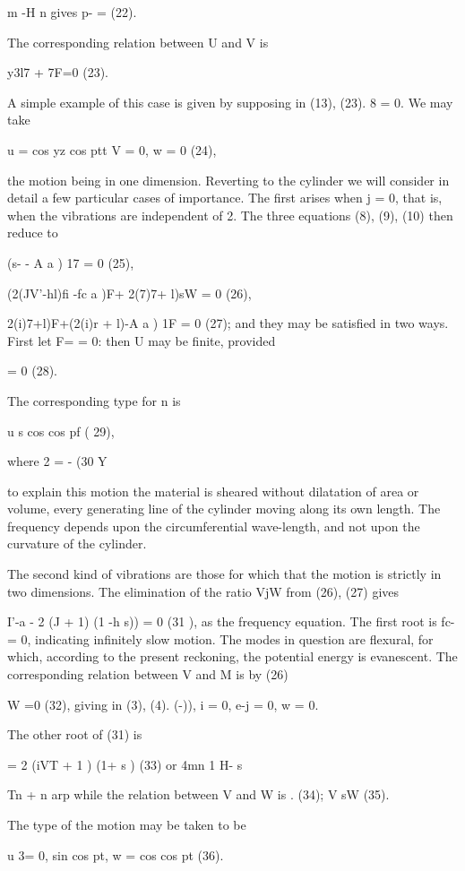 m -H n gives p- = (22).

The corresponding relation between U and V is

y3l7 + 7F=0 (23).

A simple example of this case is given by supposing in (13), (23). 8 = 0. We
may take

u = cos yz cos ptt V = 0, w = 0 (24),

the motion being in one dimension.  Reverting to the cylinder we will consider
in detail a few particular cases of importance. The first arises when j = 0,
that is, when the vibrations are independent of 2. The three equations (8),
(9), (10) then reduce to

(s- - A a ) 17 = 0 (25),

(2(JV'-hl)fi -fc a )F+ 2(7)7+ l)sW = 0 (26),

 2(i)7+l)F+(2(i)r + l)-A a ) 1F = 0 (27); and they may be satisfied in two ways.
First let F= = 0: then U may be finite, provided

= 0 (28).

The corresponding type for n is

u s cos cos pf ( 29),

where 2 = - (30 Y

to explain this motion the material is sheared without dilatation of area or volume,
every generating line of the cylinder moving along its own length. The
frequency depends upon the circumferential wave-length, and not upon the
curvature of the cylinder.

The second kind of vibrations are those for which that the motion is strictly
in two dimensions. The elimination of the ratio VjW from (26), (27) gives

I'-a - 2 (J + 1) (1 -h s)) = 0 (31 ), as the frequency equation. The first root
is fc- = 0, indicating infinitely slow motion. The modes in question are
flexural, for which, according to the present reckoning, the potential energy
is evanescent. The corresponding relation between V and M is by (26)

W =0 (32),
giving in (3), (4). (-)),
i = 0, e-j = 0, w = 0.

The other root of (31) is

= 2 (iVT + 1 ) (1+ s ) (33) or 4mn 1 H- s

Tn + n arp while the relation between V and W is .  (34); V sW  (35).

The type of the motion may be taken to be

u 3= 0, sin cos pt, w = cos cos pt (36).

